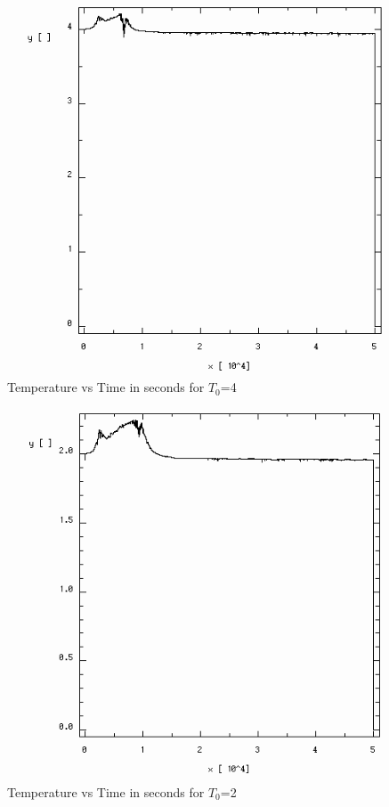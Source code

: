 \documentclass{article}
\begin{document}
\begin{multicols}{2}
\begin{figure}
\centering
\includegraphics[width=\linewidth]{./imgs/temp4_0}
\caption{Temperature vs Time in seconds for $T_0$=4}
\label{fig:temp3}
\end{figure}

\begin{figure}
\centering
\includegraphics[width=\linewidth]{./imgs/temp2_0}
\caption{Temperature vs Time in seconds for $T_0$=2}
\label{fig:temp4}
\end{figure}


\end{multicols}
\end{document}
